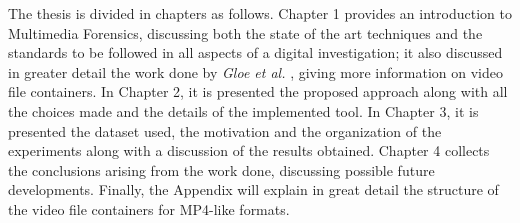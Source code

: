 The thesis is divided in chapters as follows. Chapter 1 provides an introduction to Multimedia Forensics, discussing both the state of the art techniques and the standards to be followed in all aspects of a digital investigation; it also discussed in greater detail the work done by \emph{Gloe et al.} \cite{Gloe2014S68}, giving more information on video file containers. In Chapter 2, it is presented the proposed approach along with all the choices made and the details of the implemented tool. In Chapter 3, it is presented the dataset used, the motivation and the organization of the experiments along with a discussion of the results obtained. Chapter 4 collects the conclusions arising from the work done, discussing possible future developments. Finally, the Appendix will explain in great detail the structure of the video file containers for MP4-like formats.